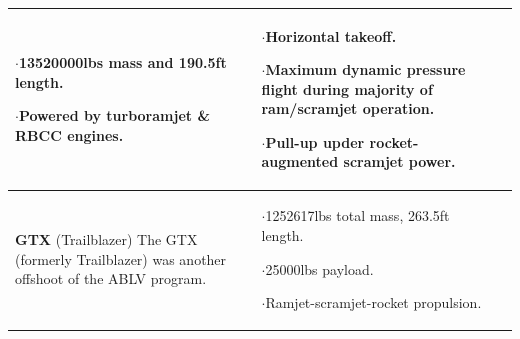 {\begin{landscape}
\begin{xltabular}{\linewidth}{|X|X|X|}
$\cdot$13520000lbs mass and 190.5ft length.

$\cdot$Powered by turboramjet \& RBCC engines.

&
\small
{}

$\cdot$Horizontal takeoff. 

$\cdot$Maximum dynamic pressure flight during majority of ram/scramjet operation.

$\cdot$Pull-up upder rocket-augmented scramjet power. 
\\ 
\hline\small \textbf{GTX} (Trailblazer)\cite{Roche2000,Trefny1999} 
\newline \newline 
The GTX (formerly Trailblazer) was another offshoot of the ABLV program.
&
\small {} 

$\cdot$1252617lbs total mass, 263.5ft length. 

$\cdot$25000lbs payload.

$\cdot$Ramjet-scramjet-rocket propulsion. 
 
&
\small {}


\end{xltabular}
\end{landscape}}
